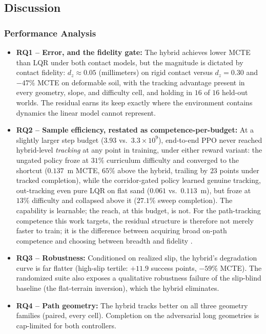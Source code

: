 \documentclass[conference]{IEEEtran}
\begin{document}
\subsection{Discussion}
\subsubsection{Performance Analysis}
\begin{itemize}
\item \textbf{RQ1 -- Error, and the fidelity gate:} The hybrid achieves lower MCTE than LQR under both contact models, but the magnitude is dictated by contact fidelity: $d_z \approx 0.05$ (millimeters) on rigid contact versus $d_z = 0.30$ and $-47\%$ MCTE on deformable soil, with the tracking advantage present in every geometry, slope, and difficulty cell, and holding in $16$ of $16$ held-out worlds. The residual earns its keep exactly where the environment contains dynamics the linear model cannot represent.
\item \textbf{RQ2 -- Sample efficiency, restated as competence-per-budget:} At a slightly larger step budget ($3.93$ vs.\ $3.3 \times 10^9$), end-to-end PPO never reached hybrid-level \emph{tracking} at any point in training, under either reward variant: the ungated policy froze at $31\%$ curriculum difficulty and converged to the shortcut ($0.137$~m MCTE, $65\%$ above the hybrid, trailing by $23$ points under tracked completion), while the corridor-gated policy learned genuine tracking, out-tracking even pure LQR on flat sand ($0.061$ vs.\ $0.113$~m), but froze at $13\%$ difficulty and collapsed above it ($27.1\%$ sweep completion). The capability is learnable; the reach, at this budget, is not. For the path-tracking competence this work targets, the residual structure is therefore not merely faster to train; it is the difference between acquiring broad on-path competence and choosing between breadth and fidelity \cite{johannink2019residual, mehta2024hybrid}.
\item \textbf{RQ3 -- Robustness:} Conditioned on realized slip, the hybrid's degradation curve is far flatter (high-slip tertile: $+11.9$ success points, $-59\%$ MCTE). The randomized suite also exposes a qualitative robustness failure of the slip-blind baseline (the flat-terrain inversion), which the hybrid eliminates.
\item \textbf{RQ4 -- Path geometry:} The hybrid tracks better on all three geometry families (paired, every cell). Completion on the adversarial long geometries is cap-limited for both controllers.

\end{itemize}
\end{document}
